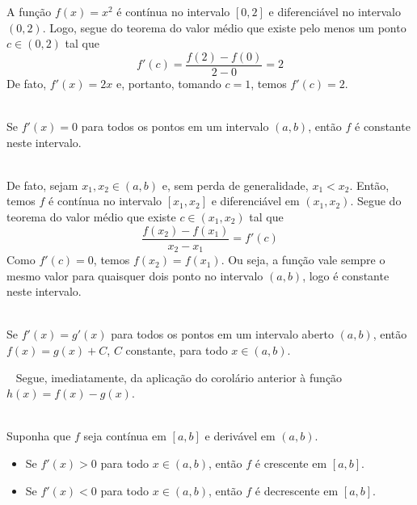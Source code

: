 \cleardoublepage\documentclass[../main.tex]{subfiles}
\begin{document}
\begin{ex}
  A função $f(x)=x^2$ é contínua no intervalo $[0,2]$ e diferenciável no intervalo $(0,2)$. Logo, segue do teorema do valor médio que existe pelo menos um ponto $c\in (0,2)$ tal que
  \begin{equation}
    f'(c)=\frac{f(2)-f(0)}{2-0}=2
  \end{equation}
  De fato, $f'(x)=2x$ e, portanto, tomando $c=1$, temos $f'(c)=2$.
\end{ex}
\begin{framed}
\begin{corol}~
 \\ Se $f'(x)=0$ para todos os pontos em um intervalo $(a, b)$, então $f$ é constante neste intervalo.
\end{corol}
\begin{framed}
\begin{dem}~
\\  De fato, sejam $x_1,x_2\in (a, b)$ e, sem perda de generalidade, $x_1<x_2$. Então, temos $f$ é contínua no intervalo $[x_1,x_2]$ e diferenciável em $(x_1,x_2)$. Segue do teorema do valor médio que existe $c\in (x_1,x_2)$ tal que
  \begin{equation}
    \frac{f(x_2)-f(x_1)}{x_2-x_1}=f'(c)
  \end{equation}
  Como $f'(c)=0$, temos $f(x_2)=f(x_1)$. Ou seja, a função vale sempre o mesmo valor para quaisquer dois ponto no intervalo $(a, b)$, logo é constante neste intervalo.
\end{dem}\end{framed}\end{framed}
\begin{framed}
\begin{corol}~\label{corol:apderiv_teomed_2}
 \\ Se $f'(x)=g'(x)$ para todos os pontos em um intervalo aberto $(a,b)$, então $f(x)=g(x)+C$, $C$ constante, para todo $x\in (a,b)$.
\end{corol}
\begin{framed}
\begin{dem}~
   Segue, imediatamente, da aplicação do corolário anterior à função $h(x)=f(x)-g(x)$.
\end{dem}\end{framed}\end{framed}
\begin{framed}
\begin{corol}~\label{corol:mono_deriv}
 \\ Suponha que $f$ seja contínua em $[a,b]$ e derivável em $(a,b)$.
  \begin{itemize}
  \item Se $f'(x)>0$ para todo $x\in (a,b)$, então $f$ é crescente em $[a,b]$.
  \item Se $f'(x)<0$ para todo $x\in (a,b)$, então $f$ é decrescente em $[a,b]$.
  \end{itemize}
\end{corol}
\end{framed}
\end{document}
